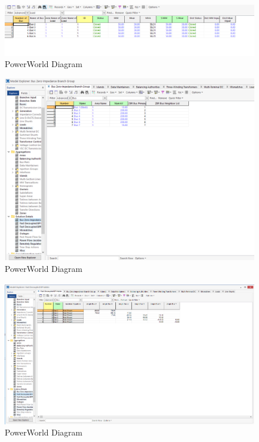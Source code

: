 \documentclass[12pt]{article}
\begin{document}
        \begin{figure}[H]
            \centerline{\includegraphics[scale=0.3]{images/PowerWorldTable4}}
            \caption{PowerWorld Diagram}
        \end{figure}
        \begin{figure}[H]
            \centerline{\includegraphics[scale=0.3]{images/PowerWorldTable5}}
            \caption{PowerWorld Diagram}
        \end{figure}
        \begin{figure}[H]
            \centerline{\includegraphics[scale=0.3]{images/PowerWorldTable6}}
            \caption{PowerWorld Diagram}
        \end{figure}
\end{document}

